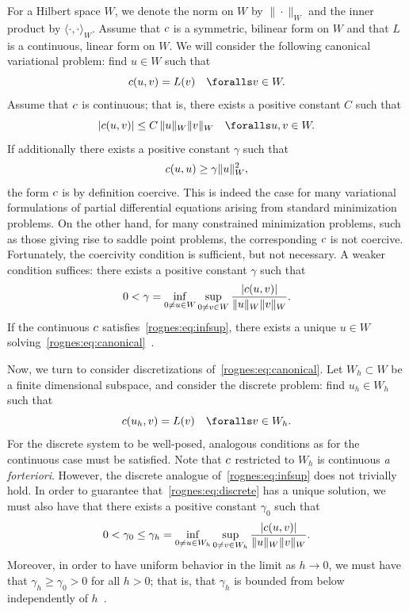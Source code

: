 For a Hilbert space $W$, we denote the norm on $W$ by
$\|\cdot\|_{W}$ and the inner product by $\langle \cdot, \cdot
\rangle_{W}$. Assume that $c$ is a symmetric, bilinear
form on $W$ and that $L$ is a continuous, linear form on
$W$. We will consider the following canonical variational
problem: find $u \in W$ such that
\begin{equation}
  \label{rognes:eq:canonical}
  \rognesc(u, v) = L(v) \quad \foralls v \in W.
\end{equation}
Assume that $c$ is continuous; that is, there exists a positive
constant $C$ such that
\begin{equation}
  |\rognesc(u, v)| \leq C \, \|u\|_{W} \|v\|_{W}
  \quad \foralls u, v \in W.
\end{equation}
If additionally there exists a positive constant $\gamma$ such that
\begin{equation}
  c(u, u) \geq \gamma \|u\|_{W}^2,
\end{equation}
the form $c$ is by definition coercive. This is indeed the case
for many variational formulations of partial differential equations
arising from standard minimization problems. On the other hand, for
many constrained minimization problems, such as those giving rise to
saddle point problems, the corresponding $c$ is not coercive.
Fortunately, the coercivity condition is sufficient, but not
necessary. A weaker condition suffices: there exists a positive
constant $\gamma$ such that
\begin{equation}
  \label{rognes:eq:infsup}
  0 < \gamma = \inf_{0 \not = u \in W} \sup_{0 \not = v \in W}
  \frac{|c(u,  v)|}{\|u\|_{W}\|v\|_{W}}.
\end{equation}
If the continuous $c$ satisfies~\eqref{rognes:eq:infsup}, there
exists a unique $u \in W$
solving~\eqref{rognes:eq:canonical}~\citep{Babuvska1972/73}.

Now, we turn to consider discretizations
of~\eqref{rognes:eq:canonical}. Let $W_h \subset W$ be a
finite dimensional subspace, and consider the discrete problem: find
$u_h \in W_h$ such that
\begin{equation}
  \label{rognes:eq:discrete}
  \rognesc(u_h, v) = L(v) \quad \foralls v \in W_h.
\end{equation}
For the discrete system to be well-posed, analogous conditions as for
the continuous case must be satisfied. Note that $c$ restricted
to $W_h$ is continuous \emph{a forteriori}. However, the discrete
analogue of~\eqref{rognes:eq:infsup} does not trivially hold. In order
to guarantee that~\eqref{rognes:eq:discrete} has a unique solution, we
must also have that there exists a positive constant $\gamma_0$ such
that
\begin{equation}
  \label{rognes:eq:infsup:discrete}
  0 < \gamma_0 \leq \gamma_h = \inf_{0 \not = u \in W_h} \sup_{0
    \not = v \in W_h} \frac{|c(u, v)|}{\|u\|_{W}\|v\|_{W}}.
\end{equation}
Moreover, in order to have uniform behavior in the limit as $h
\rightarrow 0$, we must have that $\gamma_h \geq \gamma_0 > 0$ for all
$h > 0$; that is, that $\gamma_h$ is bounded from below independently
of $h$~\citep{Babuvska1972/73}.

